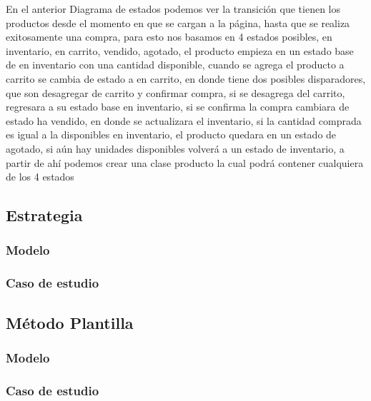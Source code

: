 En el anterior Diagrama de estados podemos ver la transición que tienen los productos desde el momento en que se cargan a la página, hasta que se realiza exitosamente una  compra, para esto nos basamos en 4 estados posibles, en inventario, en carrito, vendido, agotado, el producto empieza en un estado base de en inventario con una cantidad disponible, cuando se agrega el producto a carrito se cambia de estado a en carrito, en donde tiene dos posibles disparadores, que son desagregar de carrito y confirmar compra, si se desagrega del carrito, regresara a su estado base en inventario, si se confirma la compra cambiara de estado ha vendido, en donde se actualizara el inventario, si la cantidad comprada es igual a la disponibles en inventario, el producto quedara en un estado de agotado, si aún hay unidades disponibles volverá a un estado de inventario, a partir de ahí podemos crear una clase producto la cual podrá contener cualquiera de los 4 estados
\newpage

\subsection{Estrategia}
\subsubsection{Modelo}
\newpage
\subsubsection{Caso de estudio}
\newpage


\subsection{Método Plantilla}
\subsubsection{Modelo}


\subsubsection{Caso de estudio}


\newpage